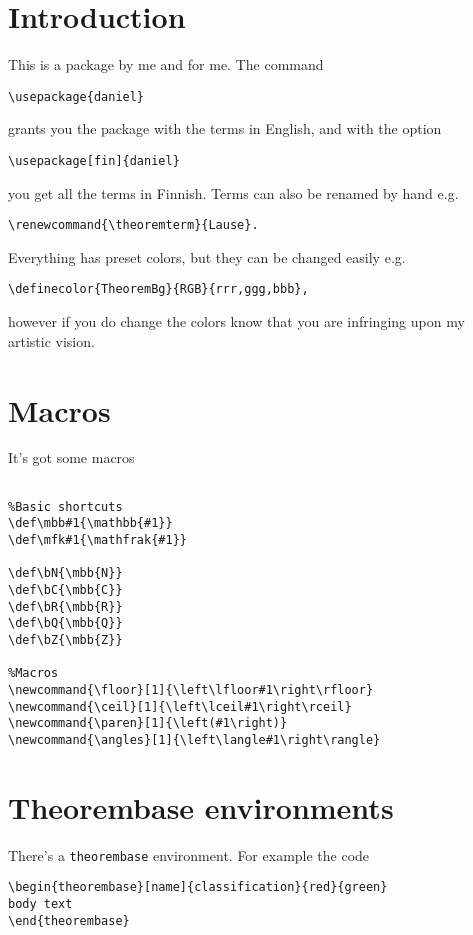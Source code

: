 \documentclass{article}
\begin{document}
\section{Introduction}
This is a package by me and for me.
The command
\begin{verbatim}\usepackage{daniel}\end{verbatim}
grants you the package with the terms in English, and with the option
\begin{verbatim}\usepackage[fin]{daniel}\end{verbatim}
you get all the terms in Finnish.
Terms can also be renamed by hand e.g.
\begin{verbatim}\renewcommand{\theoremterm}{Lause}.\end{verbatim}
Everything has preset colors, but they can be changed easily e.g.
\begin{verbatim}\definecolor{TheoremBg}{RGB}{rrr,ggg,bbb},\end{verbatim}
however if you do change the colors know that you are infringing upon my artistic vision.

\section{Macros}
It's got some macros
\begin{verbatim}

%Basic shortcuts
\def\mbb#1{\mathbb{#1}}
\def\mfk#1{\mathfrak{#1}}

\def\bN{\mbb{N}}
\def\bC{\mbb{C}}
\def\bR{\mbb{R}}
\def\bQ{\mbb{Q}}
\def\bZ{\mbb{Z}}

%Macros
\newcommand{\floor}[1]{\left\lfloor#1\right\rfloor}
\newcommand{\ceil}[1]{\left\lceil#1\right\rceil}
\newcommand{\paren}[1]{\left(#1\right)}
\newcommand{\angles}[1]{\left\langle#1\right\rangle}

\end{verbatim}

\section{Theorembase environments}
There's a \texttt{theorembase} environment. For example the code

\begin{verbatim}
\begin{theorembase}[name]{classification}{red}{green}
body text
\end{theorembase}
\end{verbatim}
\end{document}
